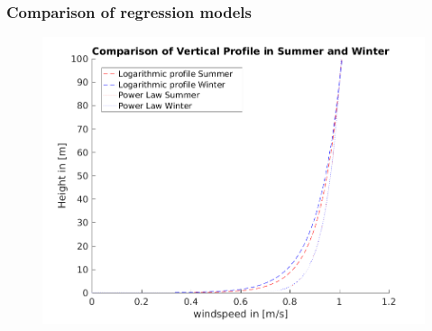 \documentclass[12pt,t]{beamer}
\begin{document}
\begin{frame}[fragile]
\frametitle{Comparison of regression models}
\begin{figure}[H]
\centering
\includegraphics[width=0.8\linewidth]{../../figures/verticalProfilesComparison.png}
\label{fig:weatherpattern}
\end{figure}
\end{frame}

\end{document}

